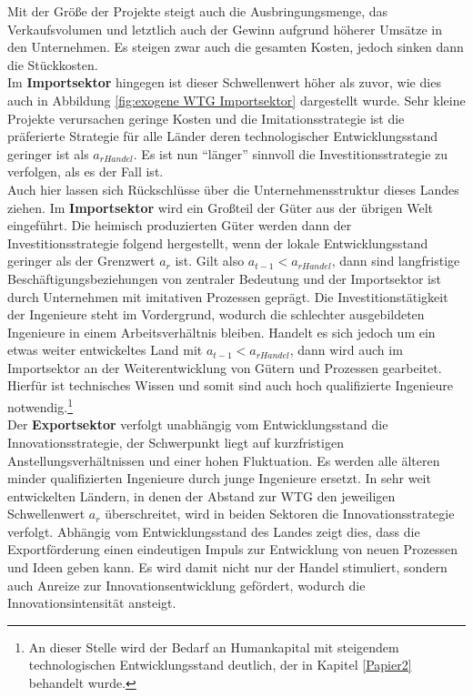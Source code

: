 %
Mit der Größe der Projekte steigt auch die Ausbringungsmenge, das Verkaufsvolumen und letztlich auch der Gewinn aufgrund höherer Umsätze in den Unternehmen. Es steigen zwar auch die gesamten Kosten, jedoch sinken dann die Stückkosten. \\
%
Im \textbf{Importsektor} hingegen ist dieser Schwellenwert höher als zuvor, wie dies auch in Abbildung \ref{fig:exogene WTG Importsektor} dargestellt wurde. Sehr kleine Projekte verursachen geringe Kosten und die \textcolor[rgb]{0,0.32,0}{Imitationsstrategie} ist die präferierte Strategie für alle Länder deren technologischer Entwicklungsstand geringer ist als $a_{rHandel}$. Es ist nun "`länger"' sinnvoll die \textcolor[rgb]{0,0.32,0}{Investitionsstrategie} zu verfolgen, als es  der Fall ist.\\ %
%
Auch hier lassen sich Rückschlüsse über die Unternehmensstruktur dieses Landes ziehen.
Im \textbf{Importsektor} wird ein Großteil der Güter aus der übrigen Welt eingeführt. Die heimisch produzierten Güter werden dann der \textcolor[rgb]{0,0.32,0}{Investitionsstrategie} folgend hergestellt, wenn der lokale Entwicklungsstand geringer als der Grenzwert $a_r$ ist. Gilt also $a_{t-1}< a_{rHandel}$, dann sind langfristige Beschäftigungsbeziehungen von zentraler Bedeutung und der Importsektor ist durch Unternehmen mit imitativen Prozessen geprägt. Die Investitionstätigkeit der Ingenieure steht im Vordergrund, wodurch die schlechter ausgebildeten Ingenieure in einem Arbeitsverhältnis bleiben. Handelt es sich jedoch um ein etwas weiter entwickeltes Land mit $a_{t-1}<a_{rHandel}$, dann wird auch im Importsektor an der Weiterentwicklung von Gütern und Prozessen gearbeitet. Hierfür ist technisches Wissen und somit sind auch hoch qualifizierte Ingenieure notwendig.\footnote{An dieser Stelle wird der Bedarf an Humankapital mit steigendem technologischen Entwicklungsstand deutlich, der in Kapitel \ref{Papier2} behandelt wurde.}\\
%
Der \textbf{Exportsektor} verfolgt unabhängig vom Entwicklungsstand die \textcolor[rgb]{0.74,0.97,0.22}{Innovationsstrategie}, der Schwerpunkt liegt auf kurzfristigen Anstellungsverhältnissen und einer hohen Fluktuation. Es werden alle älteren minder qualifizierten Ingenieure durch junge Ingenieure ersetzt.
In sehr weit entwickelten Ländern, in denen der Abstand zur WTG den jeweiligen Schwellenwert $a_r$ überschreitet, wird in beiden Sektoren die \textcolor[rgb]{0.74,0.97,0.22}{Innovationsstrategie} verfolgt. Abhängig vom Entwicklungsstand des Landes zeigt dies, dass die Exportförderung einen eindeutigen Impuls zur Entwicklung von neuen Prozessen und Ideen geben kann. Es wird damit nicht nur der Handel stimuliert, sondern auch Anreize zur Innovationsentwicklung gefördert, wodurch die Innovationsintensität ansteigt. \\

